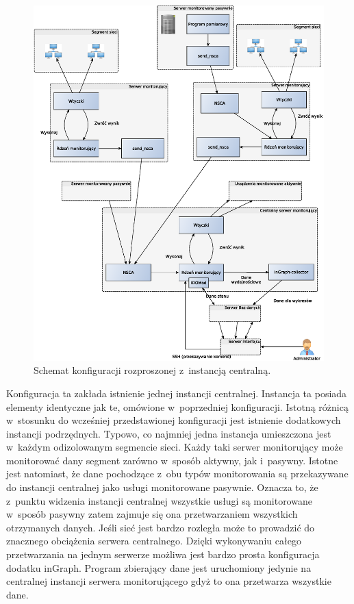 \begin{figure}[htpb]
  \caption{Schemat konfiguracji rozproszonej z~instancją centralną.}
  \label{fig:icingaNSCA}
\includegraphics[width=1\textwidth]{img/icingaNSCA}
\end{figure}

Konfiguracja ta zakłada istnienie jednej instancji
centralnej. Instancja ta posiada elementy identyczne jak te, omówione
w~poprzedniej konfiguracji. Istotną różnicą w~stosunku do wcześniej
przedstawionej konfiguracji jest istnienie dodatkowych instancji
podrzędnych. Typowo, co najmniej jedna instancja umieszczona jest
w~każdym odizolowanym segmencie sieci. Każdy taki serwer monitorujący
może monitorować dany segment zarówno w~sposób aktywny, jak
i~pasywny. Istotne jest natomiast, że dane pochodzące z~obu typów
monitorowania są przekazywane do instancji centralnej jako usługi
monitorowane pasywnie. Oznacza to, że z~punktu widzenia instancji
centralnej wszystkie usługi są monitorowane w~sposób pasywny zatem
zajmuje się ona przetwarzaniem wszystkich otrzymanych danych. Jeśli
sieć jest bardzo rozległa może to prowadzić do znacznego obciążenia
serwera centralnego. Dzięki wykonywaniu całego przetwarzania na jednym
serwerze możliwa jest bardzo prosta konfiguracja dodatku
inGraph. Program zbierający dane jest uruchomiony jedynie na
centralnej instancji serwera monitorującego gdyż to ona przetwarza
wszystkie dane.

